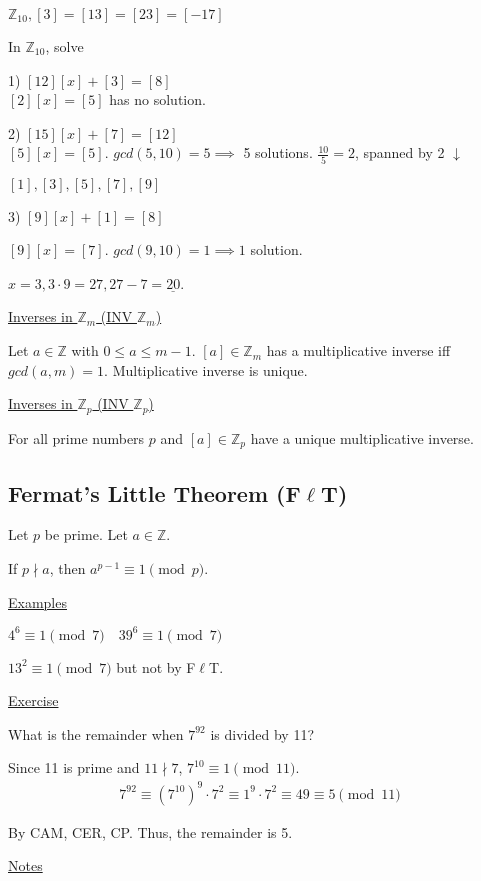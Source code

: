 \documentclass{article}
\begin{document}
$\mathbb{Z}_{10}, [3]=[13]=[23]=[-17]$

In $\mathbb{Z}_{10}$, solve

1) $[12][x] + [3] = [8]$\\
$[2][x]=[5]$ has no solution. 

2) $[15][x]+[7] = [12]$\\
$[5][x]=[5]$. $gcd(5,10) = 5 \implies$ 5 solutions. $\frac{10}{5}=2$, spanned by 2 $\downarrow$

$[1],[3],[5],[7],[9]$

3) $[9][x] + [1] = [8]$

$[9][x]=[7]$. $gcd(9,10) = 1 \implies 1$ solution.

$x=3, 3\cdot 9 = 27, 27-7 = \underline{20}$.


\underline{Inverses in $\mathbb{Z}_m$ (INV $\mathbb{Z}_m$)}

Let $a \in \mathbb{Z}$ with $0 \le a \le m-1$. $[a] \in \mathbb{Z}_m$ has a multiplicative inverse iff $gcd(a,m) = 1$. Multiplicative inverse is unique. 

\underline{Inverses in $\mathbb{Z}_p$ (INV $\mathbb{Z}_p$)}

For all prime numbers $p$ and $[a] \in \mathbb{Z}_p$ have a unique multiplicative inverse. 

\subsection{Fermat's Little Theorem (F$\ell$T)}

Let $p$ be prime. Let $a \in \mathbb{Z}$. 

If $p \nmid a$, then $a^{p-1} \equiv 1 \pmod{p}$. 

\underline{Examples}

$4^6 \equiv 1 \pmod{7} \quad 39^6 \equiv 1 \pmod{7}$

$13^2 \equiv 1 \pmod{7}$ but not by F$\ell$T. 

\underline{Exercise}

What is the remainder when $7^{92}$ is divided by 11?

Since 11 is prime and $11 \nmid 7$, $7^{10} \equiv 1 \pmod{11}$. 
\begin{align*}
    7^{92} \equiv (7^{10})^9 \cdot 7^2 \equiv 1^9 \cdot 7^2 \equiv 49 \equiv 5 \pmod{11}
\end{align*}

By CAM, CER, CP. Thus, the remainder is 5.

\underline{Notes}
\end{document}
